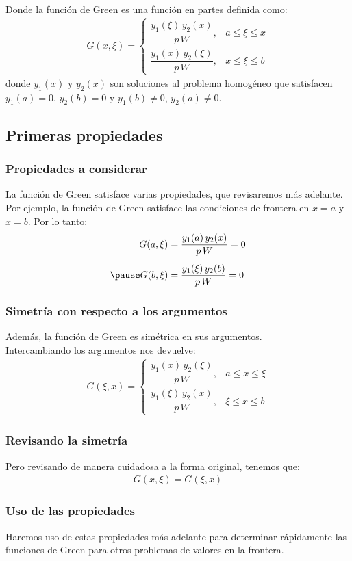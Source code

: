 \documentclass[12pt]{beamer}
\begin{document}
\begin{frame}[plain]
\begin{tcolorbox}[title={\centering Solución para problema de CDF con la función de Green}]
Donde la función de Green es una función en partes definida como:
\begin{align}
G (x, \xi) = \begin{cases}
\dfrac{y_{1} (\xi) \, y_{2} (x)}{p \, W}, & a \leq \xi \leq x \\[0.5em]
\dfrac{y_{1} (x) \, y_{2} (\xi)}{p \, W}, & x \leq \xi \leq b
\end{cases}
\label{eq:ecuacion_07_33}
\end{align}
donde $y_{1} (x)$ y $y_{2} (x)$ son soluciones al problema homogéneo que satisfacen $y_{1} (a) = 0$, $y_{2} (b) = 0$ y $y_{1} (b) \neq 0$, $y_{2} (a) \neq 0$.
\end{tcolorbox}
\end{frame}

\subsection{Primeras propiedades}

\begin{frame}
\frametitle{Propiedades a considerar}
La función de Green satisface varias propiedades, que revisaremos más adelante.
\\
\bigskip
\pause
Por ejemplo, la función de Green satisface las condiciones de frontera en $x = a$ y $x = b$. Por lo tanto:
\pause
\begin{eqnarray*}
G (a, \xi) &= \dfrac{y_{1} (a) \, y_{2} (x)}{p \, W} = 0 \\[0.5em] \pause
G (b, \xi) &= \dfrac{y_{1} (\xi) \, y_{2} (b)}{p \, W} = 0
\end{eqnarray*}
\end{frame}
\begin{frame}
\frametitle{Simetría con respecto a los argumentos}
Además, la función de Green es simétrica en sus argumentos.
\\
\bigskip
\pause
Intercambiando los argumentos nos devuelve:
\pause
\begin{align}
G (\xi, x) = \begin{cases}
\dfrac{y_{1} (x) \, y_{2} (\xi)}{p \, W}, & a \leq x \leq \xi \\[1em]
\dfrac{y_{1} (\xi) \, y_{2} (x)}{p \, W}, & \xi \leq x \leq b
\end{cases}
\label{eq:ecuacion_07_34}
\end{align}
\end{frame}
\begin{frame}
\frametitle{Revisando la simetría}
Pero revisando de manera cuidadosa a la forma original, tenemos que:
\pause
\begin{align*}
G (x, \xi) = G (\xi, x)
\end{align*}
\end{frame}
\begin{frame}
\frametitle{Uso de las propiedades}
Haremos uso de estas propiedades más adelante para determinar rápidamente las funciones de Green para otros problemas de valores en la frontera.
\end{frame}
\end{document}
